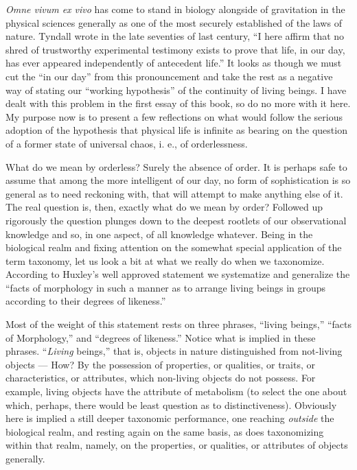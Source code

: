 \documentclass[a4paper, 11pt, oneside, polutonikogreek, english]{article}
\begin{document}
\emph{Omne vivum ex vivo} has come to stand in biology alongside of gravitation in the physical sciences generally as one of the most securely established of the laws of nature. Tyndall wrote in the late seventies of last century, ``I here affirm that no shred of trustworthy experimental testimony exists to prove that life, in our day, has ever appeared independently of antecedent life.'' It looks as though we must cut the ``in our day'' from this pronouncement and take the rest as a negative way of stating our ``working hypothesis'' of the continuity of living beings. I have dealt with this problem in the first essay of this book, so do no more with it here. My purpose now is to present a few reflections on what would follow the serious adoption of the hypothesis that physical life is infinite as bearing on the question of a former state of universal chaos, i. e., of orderlessness.

What do we mean by orderless? Surely the absence of order. It is perhaps safe to assume that among the more intelligent of our day, no form of sophistication is so general as to need reckoning with, that will attempt to make anything else of it. The real question is, then, exactly what do we mean by order? Followed up rigorously the question plunges down to the deepest rootlets of our observational knowledge and so, in one aspect, of all knowledge whatever. Being in the biological realm and fixing attention on the somewhat special application of the term taxonomy, let us look a bit at what we really do when we taxonomize. According to Huxley's well approved statement we systematize and generalize the ``facts of morphology in such a manner as to arrange living beings in groups according to their degrees of likeness.''

Most of the weight of this statement rests on three phrases, ``living beings,'' ``facts of Morphology,'' and ``degrees of likeness.'' Notice what is implied in these phrases. ``\emph{Living} beings,'' that is, objects in nature distinguished from not-living objects --- How? By the possession of properties, or qualities, or traits, or characteristics, or attributes, which non-living objects do not possess. For example, living objects have the attribute of metabolism (to select the one about which, perhaps, there would be least question as to distinctiveness). Obviously here is implied a still deeper taxonomic performance, one reaching \emph{outside} the biological realm, and resting again on the same basis, as does taxonomizing within that realm, namely, on the properties, or qualities, or attributes of objects generally.
\end{document}
